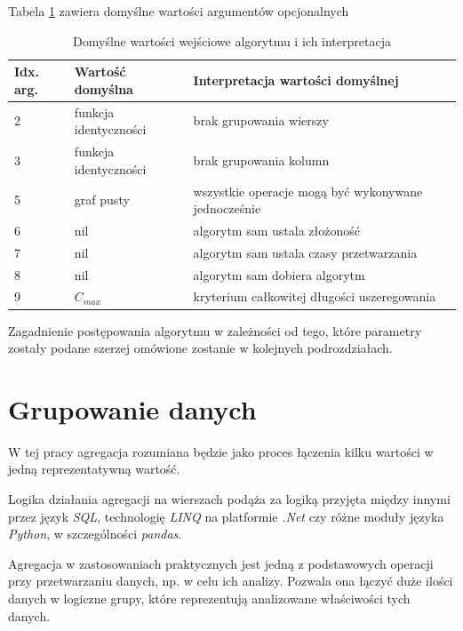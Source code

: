 \documentclass[brudnopis]{xmgr}
\begin{document}

Tabela \ref{tab:args-default} zawiera domyślne wartości argumentów opcjonalnych


\begin{table}[!tbh]
\begin{tabular}{|l|l|l|} \hline
Idx. arg. & Wartość domyślna & Interpretacja wartości domyślnej \\ \hline
2 & funkcja identyczności   & brak grupowania wierszy \\ \hline
3 & funkcja identyczności   & brak grupowania kolumn \\ \hline
5 & graf pusty              & wszystkie operacje mogą być wykonywane jednocześnie \\ \hline
6 & nil                     & algorytm sam ustala złożoność \\ \hline
7 & nil                     & algorytm sam ustala czasy przetwarzania \\ \hline
8 & nil                     & algorytm sam dobiera algorytm \\ \hline
9 & $C_{max}$               & kryterium całkowitej długości uszeregowania \\ \hline
\end{tabular}
\caption{Domyślne wartości wejściowe algorytmu i ich interpretacja\label{tab:args-default}}
\end{table}

Zagadnienie postępowania algorytmu w zależności od tego, które parametry zostały podane szerzej omówione zostanie w kolejnych podrozdziałach.

\section{Grupowanie danych}

W tej pracy agregacja rozumiana będzie jako proces łączenia kilku wartości w jedną reprezentatywną wartość.

Logika działania agregacji na wierszach podąża za logiką przyjęta między innymi przez język \emph{SQL}, technologię \emph{LINQ} na platformie \emph{.Net} czy różne moduły języka \emph{Python}, w szczególności \emph{pandas}.

Agregacja w zastosowaniach praktycznych jest jedną z podstawowych operacji przy przetwarzaniu danych, np. w celu ich analizy.
Pozwala ona łączyć duże ilości danych w logiczne grupy, które reprezentują analizowane właściwości tych danych.
\end{document}
